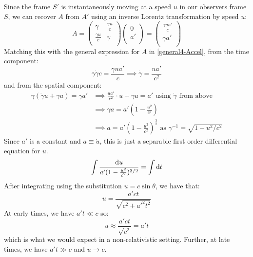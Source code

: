 \documentclass[../main.tex]{subfiles}
\begin{document}
Since the frame $S'$ is instantaneously moving at a speed $u$ in our observers frame $S$, we can recover $A$ from $A'$ using an inverse Lorentz transformation by speed $u$:
\[
  A = \begin{pmatrix}
  \gamma & \frac{\gamma u}{c} \\
  \frac{\gamma u}{c} & \gamma \\
  \end{pmatrix}\begin{pmatrix}
  0 \\
  a' \\
  \end{pmatrix} = \begin{pmatrix}
  \frac{\gamma u a'}{c} \\
  \gamma a' \\
  \end{pmatrix}
\]
Matching this with the general expression for $A$ in \cref{general4-Accel}, from the time component:
\[
  \gamma \dot{\gamma} c = \frac{\gamma u a'}{c} \implies \dot{\gamma} = \frac{ua'}{c^2}
\]
and from the spatial component:
\begin{align*}
  \gamma(\dot{\gamma}u + \gamma a) = \gamma a' &\implies \frac{ua'}{c^2} \cdot u + \gamma a = a' \text{ using $\dot{\gamma}$ from above} \\
                                               &\implies \gamma a = a'\left(1 - \frac{u^2}{c^2}\right) \\
                                               &\implies a = a'\left(1 - \frac{u^2}{c^2}\right)^{\frac{3}{2}} \text{ as $\gamma^{-1} = \sqrt{1 - u^2/c^2}$}
\end{align*}
Since $a'$ is a constant and $a \equiv \dot{u}$, this is just a separable first order differential equation for $u$.
\[
  \int \frac{\d{u}}{a'(1 - \frac{u^2}{c^2})^{3/2}} = \int \d{t}
\]
After integrating using the substitution $u = c \sin \theta$, we have that:
\[
  u = \frac{a'ct}{\sqrt{c^2 + {a'}^2t^2}}
\]
At early times, we have $a't \ll c$ so:
\[
  u \approx \frac{a' ct}{\sqrt{c^2}} = a't
\]
which is what we would expect in a non-relativistic setting.
Further, at late times, we have $a' t\gg c$ and $u \to c$.
\end{document}
